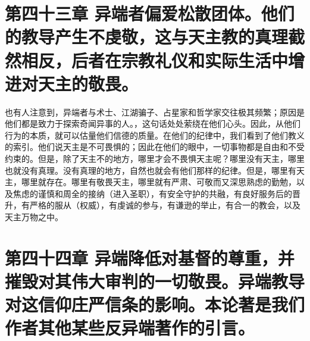 
\section{第四十三章 异端者偏爱松散团体。他们的教导产生不虔敬，这与天主教的真理截然相反，后者在宗教礼仪和实际生活中增进对天主的敬畏。}

也有人注意到，异端者与术士、江湖骗子、占星家和哲学家交往极其频繁；原因是他们都是致力于探索奇闻异事的人。，这句话处处萦绕在他们心头。因此，从他们行为的本质，就可以估量他们信德的质量。在他们的纪律中，我们看到了他们教义的索引。他们说天主是不可畏惧的；因此在他们的眼中，一切事物都是自由和不受约束的。但是，除了天主不的地方，哪里才会不畏惧天主呢？哪里没有天主，哪里也就没有真理。没有真理的地方，自然也就会有他们那样的纪律。但是，哪里有天主，哪里就存在。哪里有敬畏天主，哪里就有严肃、可敬而又深思熟虑的勤勉，以及焦虑的谨慎和周全的接纳（进入圣职），有安全守护的共融，有良好服务后的晋升，有严格的服从（权威），有虔诚的参与，有谦逊的举止，有合一的教会，以及天主万物之中。\par


\section{第四十四章 异端降低对基督的尊重，并摧毁对其伟大审判的一切敬畏。异端教导对这信仰庄严信条的影响。本论著是我们作者其他某些反异端著作的引言。}

